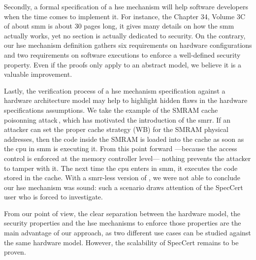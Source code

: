 Secondly, a formal specification of a \ac{hse} mechanism will help software
developers when the time comes to implement it.
%
For instance, the Chapter 34, Volume 3C of \cite{intel2014manual} about \ac{smm}
is about 30 pages long, it gives many details on how the \ac{smm} actually
works, yet no section is actually dedicated to security.
%
On the contrary, our \ac{hse} mechanism definition gathers six requirements on
hardware configurations and two requirements on software executions to enforce a
well-defined security property.
%
Even if the proofs only apply to an abstract model, we believe it is a valuable
improvement.

Lastly, the verification process of a \ac{hse} mechanism specification against a
hardware architecture model may help to highlight hidden flaws in the hardware
specifications assumptions.
%
We take the example of the SMRAM cache poisonning
attack\,\cite{wojtczuk2009smram,duflot2009smram}, which has motivated the
introduction of the \ac{smrr}.
%
If an attacker can set the proper cache strategy (WB) for the SMRAM physical
addresses, then the code inside the SMRAM is loaded into the cache as soon as
the \ac{cpu} in \ac{smm} is executing it.
%
From this point forward ---because the access control is enforced at the memory
controller level--- nothing prevents the attacker to tamper with it.
%
The next time the \ac{cpu} enters in \ac{smm}, it executes the code stored in
the cache. With a \ac{smrr}-less version of , we were not able
to conclude our \ac{hse} mechanism was sound: such a scenario draws attention of
the SpecCert user who is forced to investigate.

From our point of view, the clear separation between the hardware model, the
security properties and the \ac{hse} mechanisms to enforce those properties are
the main advantage of our approach, as two different use cases can be studied
against the same hardware model.
%
However, the scalability of SpecCert remains to be proven.
